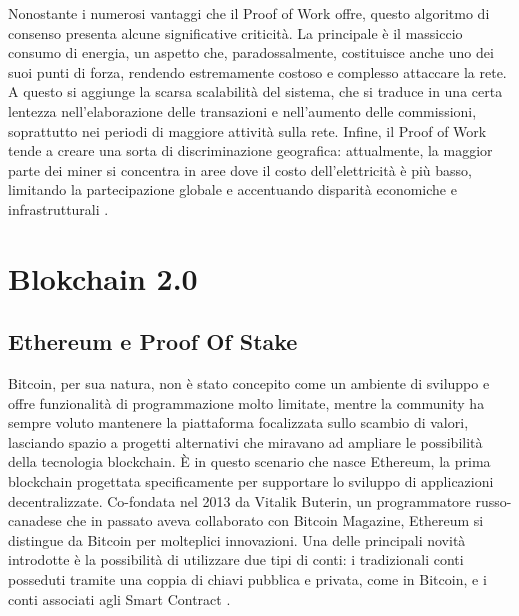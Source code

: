 Nonostante i numerosi vantaggi che il Proof of Work offre, questo algoritmo di consenso presenta alcune significative criticità. La principale è il massiccio consumo di energia, un aspetto che, paradossalmente, costituisce anche uno dei suoi punti di forza, rendendo estremamente costoso e complesso attaccare la rete.
A questo si aggiunge la scarsa scalabilità del sistema, che si traduce in una certa lentezza nell’elaborazione delle transazioni e nell’aumento delle commissioni, soprattutto nei periodi di maggiore attività sulla rete. Infine, il Proof of Work tende a creare una sorta di discriminazione geografica: attualmente, la maggior parte dei miner si concentra in aree dove il costo dell’elettricità è più basso, limitando la partecipazione globale e accentuando disparità economiche e infrastrutturali \cite{Blockchain_tecnologia_e_applicazioni_per_il_business}.

\section{Blokchain 2.0}

\subsection{Ethereum e Proof Of Stake}
Bitcoin, per sua natura, non è stato concepito come un ambiente di sviluppo e offre funzionalità di programmazione molto limitate, mentre la community ha sempre voluto mantenere la piattaforma focalizzata sullo scambio di valori, lasciando spazio a progetti alternativi che miravano ad ampliare le possibilità della tecnologia blockchain.
È in questo scenario che nasce Ethereum, la prima blockchain progettata specificamente per supportare lo sviluppo di applicazioni decentralizzate. Co-fondata nel 2013 da Vitalik Buterin, un programmatore russo-canadese che in passato aveva collaborato con Bitcoin Magazine, Ethereum si distingue da Bitcoin per molteplici innovazioni.
Una delle principali novità introdotte è la possibilità di utilizzare due tipi di conti: i tradizionali conti posseduti tramite una coppia di chiavi pubblica e privata, come in Bitcoin, e i conti associati agli Smart Contract \cite{Blockchain_guida_allecosistema}. 
